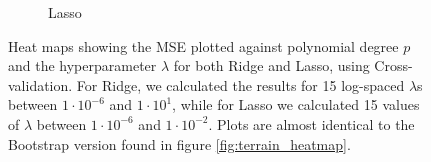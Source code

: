 \documentclass[a4paper]{article}
\begin{document}
\begin{figure}[H]
\begin{subfigure}{0.49\textwidth}
    \caption{Lasso}
  \end{subfigure}
  \caption{Heat maps showing the MSE plotted against polynomial degree $p$ and the hyperparameter $\lambda$ for both Ridge and Lasso, using Cross-validation. For Ridge, we calculated the results for 15 log-spaced $\lambda$s between $1\cdot10^{-6}$ and $1\cdot10^{1}$, while for Lasso we calculated 15 values of $\lambda$ between $1\cdot10^{-6}$ and $1\cdot10^{-2}$. Plots are almost identical to the Bootstrap version found in figure \ref{fig:terrain_heatmap}.}
  \label{fig:terrain_heatmap_CV}
\end{figure}
\end{document}

